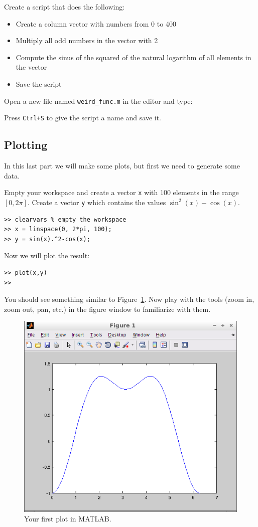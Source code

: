 \documentclass[a4paper]{article}
\begin{document}
\begin{exercise}
    Create a script that does the following:
    \begin{itemize}
        \item Create a column vector with numbers from 0 to 400
        \item Multiply all odd numbers in the vector with 2
        \item Compute the sinus of the squared of the natural logarithm of all elements in the vector
        \item Save the script
    \end{itemize}
\end{exercise}
\begin{solution}
  Open a new file named \lstinline{weird_func.m} in the editor and type:
  
  Press \lstinline{Ctrl+S} to give the script a name and save it.
\end{solution}

\subsection{Plotting}
In this last part we will make some plots, but first we need to generate some data.
\begin{exercise}
  Empty your workspace and create a vector \lstinline!x! with 100 elements in the range $[0, 2\pi]$. Create a vector \lstinline!y! which contains the values $\sin^2(x)-\cos(x)$.
\end{exercise}
\begin{solution}
  \begin{lstlisting}
>> clearvars % empty the workspace
>> x = linspace(0, 2*pi, 100);
>> y = sin(x).^2-cos(x);
  \end{lstlisting}
\end{solution}
Now we will plot the result:
\begin{lstlisting}
>> plot(x,y)
>>
\end{lstlisting}
You should see something similar to Figure~\ref{fig:plot}. Now play with the tools (zoom in, zoom out, pan, etc.) in the figure window to familiarize with them.
\begin{figure}
  \centering
  \includegraphics[width=.5\linewidth]{plot.png}
    \caption{Your first plot in MATLAB.}
    \label{fig:plot}
\end{figure}
\end{document}
